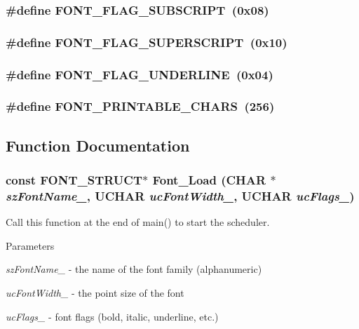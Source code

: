 \subsubsection[{FONT\_\-FLAG\_\-SUBSCRIPT}]{\setlength{\rightskip}{0pt plus 5cm}\#define FONT\_\-FLAG\_\-SUBSCRIPT~(0x08)}\label{font_8h_aba2f2be55bc2f6a7710ae9d08466a5a2}
\subsubsection[{FONT\_\-FLAG\_\-SUPERSCRIPT}]{\setlength{\rightskip}{0pt plus 5cm}\#define FONT\_\-FLAG\_\-SUPERSCRIPT~(0x10)}\label{font_8h_ad6c0e474e0d70f200d50df899dec359d}
\subsubsection[{FONT\_\-FLAG\_\-UNDERLINE}]{\setlength{\rightskip}{0pt plus 5cm}\#define FONT\_\-FLAG\_\-UNDERLINE~(0x04)}\label{font_8h_a63cfca00c150d5c4c751f9afe7791186}
\subsubsection[{FONT\_\-PRINTABLE\_\-CHARS}]{\setlength{\rightskip}{0pt plus 5cm}\#define FONT\_\-PRINTABLE\_\-CHARS~(256)}\label{font_8h_af9dc62525b9a3e70cb2042c09fdb27eb}


\subsection{Function Documentation}
\subsubsection[{Font\_\-Load}]{\setlength{\rightskip}{0pt plus 5cm}const {\bf FONT\_\-STRUCT}$\ast$ Font\_\-Load (CHAR $\ast$ {\em szFontName\_\-}, \/  UCHAR {\em ucFontWidth\_\-}, \/  UCHAR {\em ucFlags\_\-})}\label{font_8h_ad823b0c76991f72fe62d851468bbcd41}
Call this function at the end of main() to start the scheduler.


\begin{DoxyParams}{Parameters}
\item[{\em szFontName\_\-}]-\/ the name of the font family (alphanumeric) \item[{\em ucFontWidth\_\-}]-\/ the point size of the font \item[{\em ucFlags\_\-}]-\/ font flags (bold, italic, underline, etc.) \end{DoxyParams}
